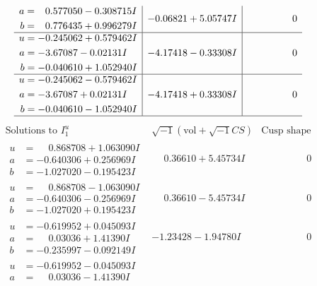 \documentclass[1p]{elsarticle_modified}
\theoremstyle{definition}
\newcommand{\I}{\sqrt{-1}}
\begin{document}
$$\begin{array}{c|c|c}
\begin{aligned}
a &= \phantom{-}0.577050 - 0.308715 I \\
b &= \phantom{-}0.776435 + 0.996279 I\end{aligned}
 & -0.06821 + 5.05747 I & \phantom{-0.000000 } 0 \\ \hline\begin{aligned}
u &= -0.245062 + 0.579462 I \\
a &= -3.67087 - 0.02131 I \\
b &= -0.040610 + 1.052940 I\end{aligned}
 & -4.17418 - 0.33308 I & \phantom{-0.000000 } 0 \\ \hline\begin{aligned}
u &= -0.245062 - 0.579462 I \\
a &= -3.67087 + 0.02131 I \\
b &= -0.040610 - 1.052940 I\end{aligned}
 & -4.17418 + 0.33308 I & \phantom{-0.000000 } 0\\
 \hline 
 \end{array}$$\newpage$$\begin{array}{c|c|c}  
\text{Solutions to }I^u_{1}& \I (\text{vol} + \sqrt{-1}CS) & \text{Cusp shape}\\
 \hline 
\begin{aligned}
u &= \phantom{-}0.868708 + 1.063090 I \\
a &= -0.640306 + 0.256969 I \\
b &= -1.027020 - 0.195423 I\end{aligned}
 & \phantom{-}0.36610 + 5.45734 I & \phantom{-0.000000 } 0 \\ \hline\begin{aligned}
u &= \phantom{-}0.868708 - 1.063090 I \\
a &= -0.640306 - 0.256969 I \\
b &= -1.027020 + 0.195423 I\end{aligned}
 & \phantom{-}0.36610 - 5.45734 I & \phantom{-0.000000 } 0 \\ \hline\begin{aligned}
u &= -0.619952 + 0.045093 I \\
a &= \phantom{-}0.03036 + 1.41390 I \\
b &= -0.235997 - 0.092149 I\end{aligned}
 & -1.23428 - 1.94780 I & \phantom{-0.000000 } 0 \\ \hline\begin{aligned}
u &= -0.619952 - 0.045093 I \\
a &= \phantom{-}0.03036 - 1.41390 I \\

\end{aligned}
\end{array}$$
\end{document}
